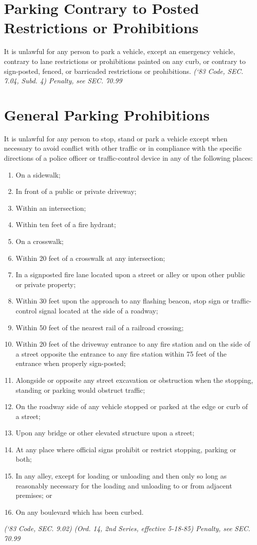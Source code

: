 \setcounter{section}{14}
\section{Parking Contrary to Posted Restrictions or Prohibitions}
It is unlawful for any person to park a vehicle, except an emergency vehicle, contrary to lane restrictions or prohibitions painted on any curb, or contrary to sign-posted, fenced, or barricaded restrictions or prohibitions.\newline
\emph{(‘83 Code, SEC. 7.04, Subd. 4)  Penalty, see SEC. 70.99}

\section{General Parking Prohibitions}
It is unlawful for any person to stop, stand or park a vehicle except when necessary to avoid conflict with other traffic or in compliance with the specific directions of a police officer or traffic-control device in any of the following places:
\begin{enumerate}[{\indent}A)]
\item On a sidewalk;
\item In front of a public or private driveway;
\item Within an intersection;
\item Within ten feet of a fire hydrant;
\item On a crosswalk;
\item Within 20 feet of a crosswalk at any intersection;
\item In a signposted fire lane located upon a street or alley or upon other public or private property;
\item Within 30 feet upon the approach to any flashing beacon, stop sign or traffic-control signal located at the side of a roadway;
\item Within 50 feet of the nearest rail of a railroad crossing;
\item Within 20 feet of the driveway entrance to any fire station and on the side of a street opposite the entrance to any fire station within 75 feet of the entrance when properly sign-posted;
\item Alongside or opposite any street excavation or obstruction when the stopping, standing or parking would obstruct traffic;
\item On the roadway side of any vehicle stopped or parked at the edge or curb of a street;
\item Upon any bridge or other elevated structure upon a street;
\item At any place where official signs prohibit or restrict stopping, parking or both;
\item In any alley, except for loading or unloading and then only so long as reasonably necessary for the loading and unloading to or from adjacent premises; or
\item On any boulevard which has been curbed.
\end{enumerate}
\emph{(‘83 Code, SEC. 9.02)  (Ord. 14, 2nd Series, effective 5-18-85)  Penalty, see SEC. 70.99}

